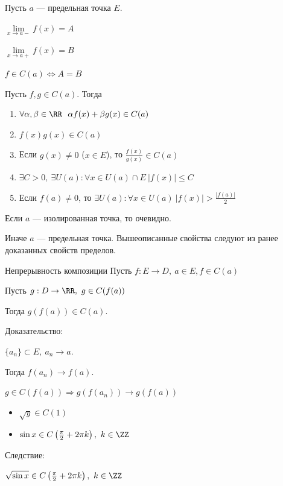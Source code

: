 \begin{exercise}{}{}
    Пусть \( a \) --- предельная точка \( E \).

    \( \lim\limits_{x \to a-} f(x) = A \)

    \( \lim\limits_{x \to a+} f(x) = B \)

    \( f \in C(a) \Leftrightarrow A = B \)
\end{exercise}

Пусть \( f, g \in C(a) \).
Тогда
\begin{enumerate}
    \item
        \( \forall \alpha, \beta \in \RR \ \ \alpha f(x) + \beta g(x) \in C(a) \)
    \item
        \( f(x)g(x) \in C(a) \)
    \item
        Если \( g(x) \neq 0 \) (\( x \in E \)), то \( \frac{f(x)}{g(x)} \in C(a) \)
    \item
        \( \exists C > 0, \ \exists U(a) : \forall x \in U(a) \cap E \ | f(x) | \leq C \)
    \item
        Если \( f(a) \neq 0 \), то \( \exists U(a) : \forall x \in U(a) \ | f(x) | > \frac{| f(a) |}{2} \)
\end{enumerate}

Если \( a \) --- изолированная точка, то очевидно.

Иначе \( a \) --- предельная точка.
Вышеописанные свойства следуют из ранее доказанных свойств пределов.

\begin{thrm}{Непрерывность композиции}{}
    Пусть \( f : E \to D, \ a \in E, f \in C(a) \)

    Пусть \( g : D \to \RR, \ g \in C(f(a)) \)

    Тогда \( g(f(a)) \in C(a) \).
\end{thrm}

Доказательство:

\( \{ a_n \} \subset E, \ a_n \to a \).

Тогда \( f(a_n) \to f(a) \).

\( g \in C(f(a)) \Rightarrow g(f(a_n)) \to g(f(a)) \)

\begin{example}{}{}
    \begin{itemize}
        \item
            \( \sqrt{y} \in C(1) \)
        \item
            \( \sin x \in C \left( \frac{\pi}{2} + 2 \pi k \right), \ k \in \ZZ \)
    \end{itemize}

    Следствие:

    \( \sqrt{\sin x} \in C \left( \frac{\pi}{2} + 2 \pi k \right), \ k \in \ZZ \)
\end{example}

